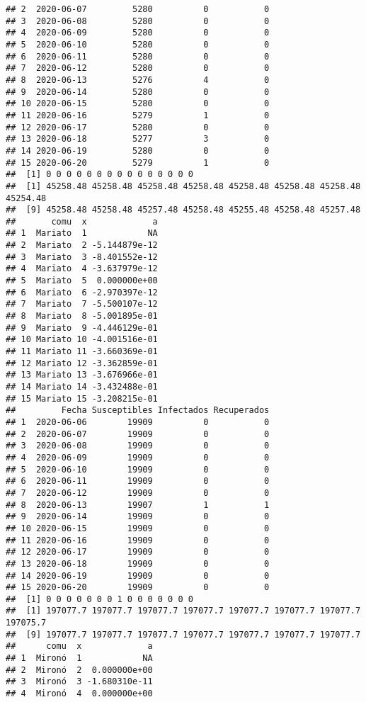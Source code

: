 \documentclass[
]{article}
\begin{document}
\begin{verbatim}
## 2  2020-06-07         5280          0           0
## 3  2020-06-08         5280          0           0
## 4  2020-06-09         5280          0           0
## 5  2020-06-10         5280          0           0
## 6  2020-06-11         5280          0           0
## 7  2020-06-12         5280          0           0
## 8  2020-06-13         5276          4           0
## 9  2020-06-14         5280          0           0
## 10 2020-06-15         5280          0           0
## 11 2020-06-16         5279          1           0
## 12 2020-06-17         5280          0           0
## 13 2020-06-18         5277          3           0
## 14 2020-06-19         5280          0           0
## 15 2020-06-20         5279          1           0
##  [1] 0 0 0 0 0 0 0 0 0 0 0 0 0 0 0
##  [1] 45258.48 45258.48 45258.48 45258.48 45258.48 45258.48 45258.48 45254.48
##  [9] 45258.48 45258.48 45257.48 45258.48 45255.48 45258.48 45257.48
##       comu  x             a
## 1  Mariato  1            NA
## 2  Mariato  2 -5.144879e-12
## 3  Mariato  3 -8.401552e-12
## 4  Mariato  4 -3.637979e-12
## 5  Mariato  5  0.000000e+00
## 6  Mariato  6 -2.970397e-12
## 7  Mariato  7 -5.500107e-12
## 8  Mariato  8 -5.001895e-01
## 9  Mariato  9 -4.446129e-01
## 10 Mariato 10 -4.001516e-01
## 11 Mariato 11 -3.660369e-01
## 12 Mariato 12 -3.362859e-01
## 13 Mariato 13 -3.676966e-01
## 14 Mariato 14 -3.432488e-01
## 15 Mariato 15 -3.208215e-01
##         Fecha Susceptibles Infectados Recuperados
## 1  2020-06-06        19909          0           0
## 2  2020-06-07        19909          0           0
## 3  2020-06-08        19909          0           0
## 4  2020-06-09        19909          0           0
## 5  2020-06-10        19909          0           0
## 6  2020-06-11        19909          0           0
## 7  2020-06-12        19909          0           0
## 8  2020-06-13        19907          1           1
## 9  2020-06-14        19909          0           0
## 10 2020-06-15        19909          0           0
## 11 2020-06-16        19909          0           0
## 12 2020-06-17        19909          0           0
## 13 2020-06-18        19909          0           0
## 14 2020-06-19        19909          0           0
## 15 2020-06-20        19909          0           0
##  [1] 0 0 0 0 0 0 0 1 0 0 0 0 0 0 0
##  [1] 197077.7 197077.7 197077.7 197077.7 197077.7 197077.7 197077.7 197075.7
##  [9] 197077.7 197077.7 197077.7 197077.7 197077.7 197077.7 197077.7
##      comu  x             a
## 1  Mironó  1            NA
## 2  Mironó  2  0.000000e+00
## 3  Mironó  3 -1.680310e-11
## 4  Mironó  4  0.000000e+00

\end{verbatim}
\end{document}
